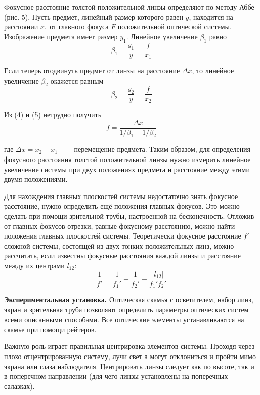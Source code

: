 \documentclass[14pt]{article}
\begin{document}
Фокусное расстояние толстой положительной линзы определяют по
методу Аббе (рис. 5). Пусть предмет, линейный размер
которого равен
$y$,
находится на расстоянии
$x_1$ от главного фокуса
$F$ положительной оптической
системы. Изображение предмета имеет размер
$y_1$. Линейное
увеличение
$\beta_1$ равно
\begin{equation}
\beta_1 = \frac{y_1}{y} = \frac{f}{x_1}
\end{equation}

Если теперь отодвинуть предмет от линзы на расстояние $\Delta x$, то линейное
увеличение $\beta_2$ окажется равным
\begin{equation}
\beta_2 = \frac{y_2}{y} = \frac{f}{x_2}
\end{equation}

Из (4) и (5) нетрудно получить
\begin{equation}
f = \frac{\Delta x}{1/\beta_1 - 1/\beta_2}
\end{equation}

где $\Delta x = x_2 - x_1$ - — перемещение предмета.
Таким образом, для определения фокусного расстояния толстой положительной линзы нужно измерить
линейное увеличение системы при двух положениях предмета и
расстояние между этими двумя положениями.


Для нахождения главных плоскостей системы недостаточно знать
фокусное расстояние, нужно определить ещё положения главных фокусов.
Это можно сделать при помощи зрительной трубы, настроенной на бесконечность. Отложив от главных фокусов отрезки, равные фокусному
расстоянию, можно найти положения главных плоскостей системы.
Теоретически фокусное расстояние
$f'$ сложной системы, состоящей из
двух тонких положительных линз, можно рассчитать, если известны
фокусные расстояния
каждой линзы и расстояние между их центрами
$l_{12}$:
\begin{equation}
\frac{1}{f'} = \frac{1}{f_1'} + \frac{1}{f_2'} - \frac{|l_{12}|}{f_1'f_2'}
\end{equation}

\textbf{Экспериментальная
установка.} Оптическая скамья с осветителем,
набор линз, экран
и зрительная труба позволяют определить параметры
оптических систем всеми описанными способами. Все оптические элементы
устанавливаются на скамье при помощи рейтеров.

Важную роль играет правильная центрировка элементов системы.
Проходя через плохо отцентрированную систему, лучи свет
а могут отклониться
и пройти мимо экрана или глаза наблюдателя. Центрировать
линзы следует
как по высоте, так
и в поперечном направлении (для чего
линзы
установлены на поперечных салазках). 
\end{document}
